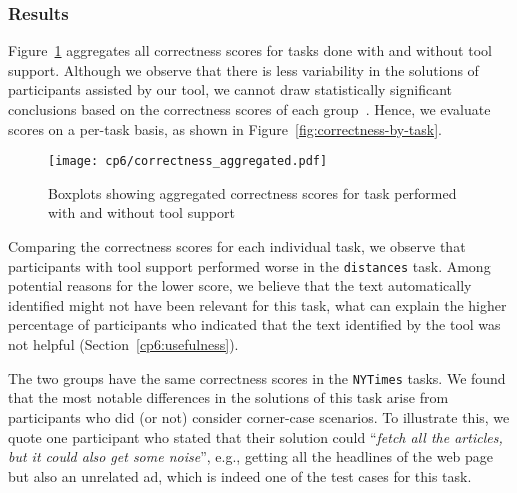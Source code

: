 

\subsubsection{Results}


Figure~\ref{fig:correctness-overall} aggregates all correctness scores for tasks done with and without tool support.
Although we observe that there is less variability in the solutions of participants assisted by our tool,
we cannot draw statistically significant conclusions based on the correctness scores of each group~\cite{Lazar2017-cp3}.
Hence, we evaluate scores on a per-task basis, as shown in Figure~\ref{fig:correctness-by-task}.



\medskip
\begin{figure}
    \centering
    \texttt{[image: cp6/correctness\_aggregated.pdf]}
    \caption{Boxplots showing aggregated correctness scores for task performed with and without tool support}
    \label{fig:correctness-overall}
\end{figure}




Comparing the correctness scores for each individual task, we observe that participants with tool support performed worse in the \texttt{distances} task. 
Among potential reasons for the lower score, we believe that the text automatically identified 
might not have been relevant for this task, what can explain the higher percentage of participants
who indicated that the text identified by the tool was not helpful (Section~\ref{cp6:usefulness}).



The two groups have the same correctness scores in the \texttt{NYTimes} tasks.
We found that the most notable differences in the solutions of this task arise from participants who did (or not) consider corner-case scenarios.
To illustrate this, we quote one participant who stated that their solution could ``\textit{fetch all the articles, but it could also get some noise}'',
e.g., getting all the headlines of the web page but also an unrelated ad, which is indeed one of the test cases for this task. 



